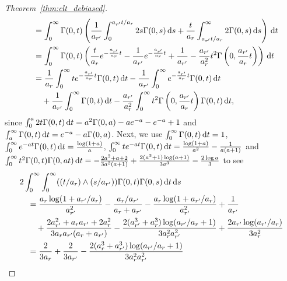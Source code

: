\begin{proof}[Theorem~\ref{thm:clt_debiased}]
\begin{align*}
    &\quad=
    \int_0^\infty
    \Gamma(0, t)
    \left(
      \frac{1}{a_{r'}}
      \int_0^{a_{r'} t / a_r}
      2 s \Gamma(0, s)
      \,\mathrm{d}s
      +
      \frac{t}{a_r}
      \int_{a_{r'} t / a_r}^\infty
      2 \Gamma(0, s)
      \,\mathrm{d}s
    \right)
    \,\mathrm{d}t \\
    &\quad=
    \int_0^\infty
    \Gamma(0, t)
    \left(
      \frac{t}{a_r}
      e^{- \frac{a_{r'}}{a_r}t}
      - \frac{1}{a_{r'}} e^{- \frac{a_{r'}}{a_r}t}
      + \frac{1}{a_{r'}}
      - \frac{a_{r'}}{a_r^2} t^2
      \Gamma\left(0, \frac{a_{r'}}{a_r} t\right)
    \right)
    \,\mathrm{d}t \\
    &\quad=
    \frac{1}{a_r}
    \int_0^\infty
    t e^{- \frac{a_{r'}}{a_r} t}
    \Gamma(0, t)
    \,\mathrm{d}t
    - \frac{1}{a_{r'}}
    \int_0^\infty
    e^{- \frac{a_{r'}}{a_r} t}
    \Gamma(0, t)
    \,\mathrm{d}t \\
    &\qquad+
    \frac{1}{a_{r'}}
    \int_0^\infty
    \Gamma(0, t)
    \,\mathrm{d}t
    -
    \frac{a_{r'}}{a_r^2}
    \int_0^\infty
    t^2 \Gamma\left(0, \frac{a_{r'}}{a_r} t\right)
    \Gamma(0, t)
    \,\mathrm{d}t,
  \end{align*}
  since
  $\int_0^a 2 t \Gamma(0, t) \,\mathrm{d}t = a^2 \Gamma(0, a) - a e^{-a} -e^{-a} + 1$
  and
  $\int_a^\infty \Gamma(0, t) \,\mathrm{d}t = e^{-a} - a \Gamma(0, a)$.
  Next, we use
  $ \int_{0}^{\infty} \Gamma(0, t) \,\mathrm{d}t = 1$,
  $\int_{0}^{\infty} e^{-at} \Gamma(0, t) \,\mathrm{d}t
  = \frac{\log(1+a)}{a}$,
  $\int_{0}^{\infty} t e^{-at} \Gamma(0, t) \,\mathrm{d}t
  = \frac{\log(1+a)}{a^2} - \frac{1}{a(a+1)}$
  and
  $\int_{0}^{\infty} t^2 \Gamma(0, t) \Gamma(0, at) \,\mathrm{d}t
  = - \frac{2a^2 + a + 2}{3a^2 (a+1)} + \frac{2(a^3 + 1) \log(a+1)}{3a^3}
  - \frac{2 \log a}{3}$
  to see
  \begin{align*}
    &2
    \int_{0}^{\infty}
    \int_{0}^{\infty}
    ((t / a_r) \wedge (s / a_{r'}))
    \Gamma(0, t)
    \Gamma(0, s)
    \diff t
    \diff s \\
    &\quad=
    \frac{a_r \log(1+a_{r'} / a_r)}{a_{r'}^2}
    - \frac{a_r / a_{r'}}{a_r + a_{r'}}
    - \frac{a_r \log(1 + a_{r'} / a_r)}{a_{r'}^2}
    + \frac{1}{a_{r'}} \\
    &\qquad+
    \frac{2 a_{r'}^2 + a_r a_{r'} + 2 a_r^2}
    {3 a_r a_{r'} (a_r + a_{r'})}
    - \frac{2(a_{r'}^3 + a_r^3) \log(a_{r'} / a_r+1)}{3 a_r^2 a_{r'}^2}
    + \frac{2 a_{r'} \log (a_{r'} / a_r)}{3 a_r^2} \\
    &\quad=
    \frac{2}{3 a_r} + \frac{2}{3 a_{r'}}
    - \frac{2(a_r^3 + a_{r'}^3 ) \log(a_{r'} / a_{r}+1)}
    {3 a_r^2 a_{r'}^2}

\end{align*}
\end{proof}
